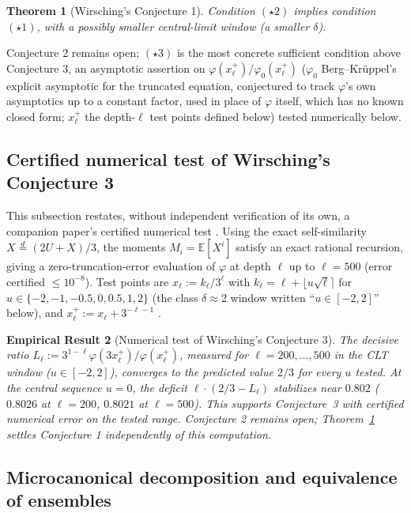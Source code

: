 \documentclass[11pt]{article}
\newtheorem{theorem}{Theorem}[section]
\newtheorem{empirical}[theorem]{Empirical Result}
\theoremstyle{definition}
\theoremstyle{remark}
\begin{document}
\begin{theorem}[Wirsching's Conjecture 1]\label{thm:wirsching-conj1}
Condition $(\star2)$ implies condition $(\star1)$, with a possibly
smaller central-limit window (a smaller $\delta$).
\end{theorem}

Conjecture 2 remains open; $(\star3)$ is the most concrete sufficient
condition above Conjecture 3, an asymptotic assertion on
$\varphi(x_\ell^+)/\varphi_0(x_\ell^+)$ ($\varphi_0$ Berg--Kr\"uppel's
explicit asymptotic \cite{BergKruppel1998} for the truncated equation,
conjectured to track $\varphi$'s own asymptotics up to a constant
factor, used in place of $\varphi$ itself, which has no known closed
form; $x_\ell^+$ the depth-$\ell$ test points defined below) tested
numerically below.

\subsection{Certified numerical test of Wirsching's Conjecture 3}

This subsection restates, without independent verification of its
own, a companion paper's certified numerical test
\cite{WirschingCompanion}. Using the exact self-similarity
$X\overset{d}{=}(2U+X)/3$, the moments
$M_i=\mathbb{E}[X^i]$ satisfy an exact rational recursion, giving a
zero-truncation-error evaluation of $\varphi$ at depth $\ell$ up to
$\ell=500$ (error certified $\le10^{-8}$). Test points are
$x_\ell:=k_\ell/3^\ell$ with $k_\ell=\ell+\lfloor u\sqrt\ell\rceil$ for
$u\in\{-2,-1,-0.5,0,0.5,1,2\}$ (the class $\delta\approx2$ window
written ``$u\in[-2,2]$'' below), and $x_\ell^+:=x_\ell+3^{-\ell-1}$
\cite[\S7]{Wirsching2003}.

\begin{empirical}[Numerical test of Wirsching's Conjecture 3]
\label{thm:conjecture3}
The decisive ratio $L_\ell := 3^{1-\ell}\varphi(3x_\ell^+)/\varphi(x_\ell^+)$,
measured for $\ell=200,\dots,500$ in the CLT window ($u\in[-2,2]$),
converges to the predicted value $2/3$ for every $u$ tested. At the
central sequence $u=0$, the deficit $\ell\cdot(2/3-L_\ell)$ stabilizes
near $0.802$ ($0.8026$ at $\ell=200$, $0.8021$ at $\ell=500$). This
supports Conjecture~3 with certified numerical error on the tested
range. Conjecture 2 remains open;
Theorem~\ref{thm:wirsching-conj1} settles Conjecture 1 independently of
this computation.
\end{empirical}

\subsection{Microcanonical decomposition and equivalence of ensembles}
\end{document}
